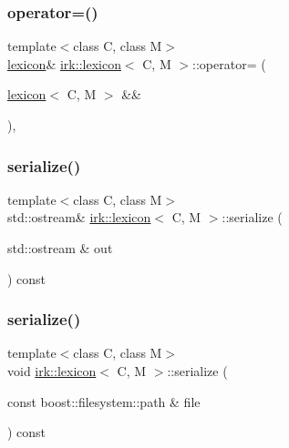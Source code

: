 \mbox{\label{classirk_1_1lexicon_a82c097a1fabbd328402d3bc665aa1f47}} 
\subsubsection{\texorpdfstring{operator=()}{operator=()}\hspace{0.1cm}{\footnotesize\ttfamily [2/2]}}
{\footnotesize\ttfamily template$<$class C, class M$>$ \\
\mbox{\hyperlink{classirk_1_1lexicon}{lexicon}}\& \mbox{\hyperlink{classirk_1_1lexicon}{irk\+::lexicon}}$<$ C, M $>$\+::operator= (\begin{DoxyParamCaption}\item[{\mbox{\hyperlink{classirk_1_1lexicon}{lexicon}}$<$ C, M $>$ \&\&}]{ }\end{DoxyParamCaption})\hspace{0.3cm}{\ttfamily [delete]}, {\ttfamily [noexcept]}}

\mbox{\label{classirk_1_1lexicon_a85936c0718eedac4ed31b763c46b03de}} 
\subsubsection{\texorpdfstring{serialize()}{serialize()}\hspace{0.1cm}{\footnotesize\ttfamily [1/2]}}
{\footnotesize\ttfamily template$<$class C, class M$>$ \\
std\+::ostream\& \mbox{\hyperlink{classirk_1_1lexicon}{irk\+::lexicon}}$<$ C, M $>$\+::serialize (\begin{DoxyParamCaption}\item[{std\+::ostream \&}]{out }\end{DoxyParamCaption}) const\hspace{0.3cm}{\ttfamily [inline]}}

\mbox{\label{classirk_1_1lexicon_ab326b474e74e3253c985b55e8986437e}} 
\subsubsection{\texorpdfstring{serialize()}{serialize()}\hspace{0.1cm}{\footnotesize\ttfamily [2/2]}}
{\footnotesize\ttfamily template$<$class C, class M$>$ \\
void \mbox{\hyperlink{classirk_1_1lexicon}{irk\+::lexicon}}$<$ C, M $>$\+::serialize (\begin{DoxyParamCaption}\item[{const boost\+::filesystem\+::path \&}]{file }\end{DoxyParamCaption}) const\hspace{0.3cm}{\ttfamily [inline]}}

